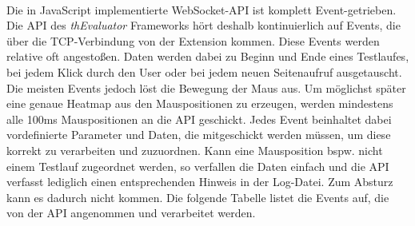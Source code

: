 \\
Die in JavaScript implementierte WebSocket-API ist komplett Event-getrieben. Die API des \textit{thEvaluator} Frameworks hört deshalb kontinuierlich auf Events, die über die TCP-Verbindung von der Extension kommen. Diese Events werden relative oft angestoßen. Daten werden dabei zu Beginn und Ende eines Testlaufes, bei jedem Klick durch den User oder bei jedem neuen Seitenaufruf ausgetauscht. Die meisten Events jedoch löst die Bewegung der Maus aus. Um möglichst später eine genaue Heatmap aus den Mauspositionen zu erzeugen, werden mindestens alle 100ms Mauspositionen an die API geschickt. Jedes Event beinhaltet dabei vordefinierte Parameter und Daten, die mitgeschickt werden müssen, um diese korrekt zu verarbeiten und zuzuordnen. Kann eine Mausposition bspw. nicht einem Testlauf zugeordnet werden, so verfallen die Daten einfach und die API verfasst lediglich einen entsprechenden Hinweis in der \Gls{Log-Datei}. Zum Absturz kann es dadurch nicht kommen. Die folgende Tabelle listet die Events auf, die von der API angenommen und verarbeitet werden.\\
\\
\\
